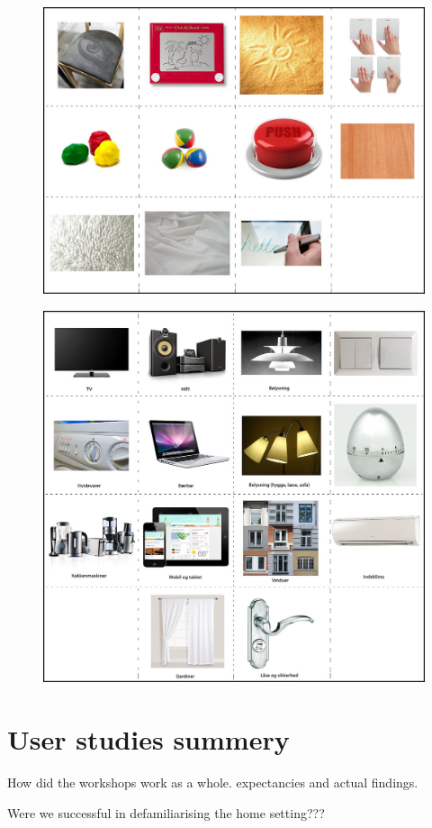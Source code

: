 \begin{figure}
\centering
\begin{minipage}[t]{.5\textwidth}
  \centering
  \includegraphics[width=0.9\linewidth]{workshops/technology-cards}
  \label{ch:workshops:technology-cards}
\end{minipage}%
\begin{minipage}[t]{.5\textwidth}
  \centering
  \includegraphics[width=0.9\linewidth]{workshops/appliance-cards}
  \label{ch:workshops:appliance-cards}
\end{minipage}
\end{figure}


\section{User studies summery}
\label{ch:workshops:discussion}

How did the workshops work as a whole. expectancies and actual findings.

 Were we successful in defamiliarising the home setting???



